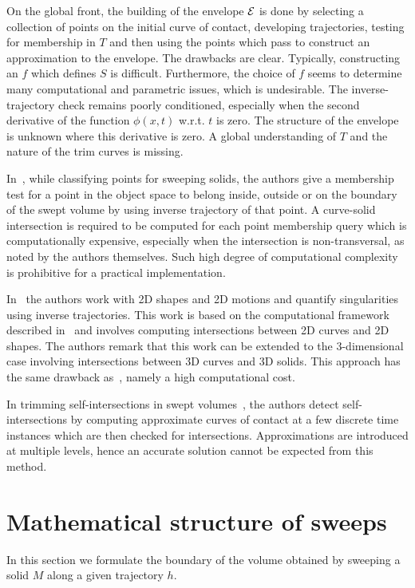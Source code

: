 \documentclass{elsart5p}
\begin{document}
On the global front, the building of the envelope ${\cal E}$ is 
done by selecting a collection of points on the initial curve of 
contact, developing trajectories, testing for membership in $T$ and then 
using the points which pass to construct an approximation to the envelope. 
The drawbacks are clear. Typically, constructing an $f$ which defines $S$ is 
difficult. Furthermore, the choice of $f$ seems to determine many computational
and parametric issues, which is undesirable. The inverse-trajectory check 
remains poorly conditioned, especially when the second derivative of 
the function $\phi(x,t)$ w.r.t. $t$ is zero. The structure of the envelope is unknown where 
this derivative is zero.  
A global understanding of $T$ and the nature of
the trim curves is missing.  

In~\cite{classifyPoints}, while classifying points for sweeping solids, the authors give a membership test for a point in the object space to belong inside, outside or on the boundary of the 
swept volume by using inverse trajectory of that point.  
A curve-solid intersection is required to be computed for each point membership query which is computationally expensive, especially when the intersection is non-transversal, as noted by the authors themselves.  Such high degree of computational complexity is prohibitive for a practical implementation.  

In~\cite{planarSwep} the authors work with 2D shapes and 2D motions and quantify singularities using inverse 
trajectories.  This work is based on the computational framework  described in~\cite{classifyPoints}  and involves computing intersections between 2D curves and 2D shapes. 
The authors remark that this work can be extended to the 3-dimensional case involving intersections between 3D curves and 3D solids.  This approach has the same drawback 
as~\cite{classifyPoints}, namely a high computational cost.

In trimming self-intersections in swept volumes~\cite{selfIntersections}, the authors detect self-intersections by computing approximate curves of contact at a few discrete time instances 
which are then checked for intersections.  Approximations are introduced at multiple levels, hence an accurate solution cannot be expected from this method.
\section{Mathematical structure of sweeps} \label{simpleSec}

In this section we formulate the boundary of the volume obtained by sweeping a solid $M$ along 
a given trajectory $h$.  
\end{document}
